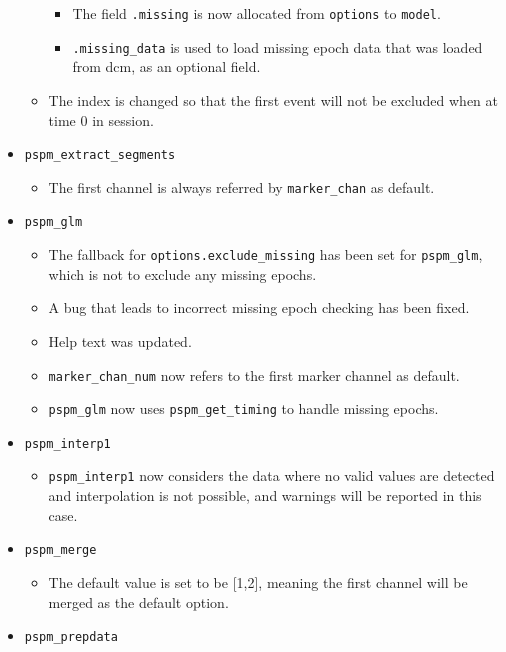 \documentclass[english]{article}
\numberwithin{equation}{section}
\numberwithin{figure}{section}
\begin{document}
\begin{itemize}
\begin{itemize}
    		\begin{itemize}
    			\item The field \texttt{.missing} is now allocated from \texttt{options} to \texttt{model}.
    			\item \texttt{.missing\_data} is used to load missing epoch data that was loaded 
    						from dcm, as an optional field.
    		\end{itemize}
    		\item The index is changed so that the first event will not be excluded when at time 0 in session.
    	\end{itemize}
    	\item \texttt{pspm\_extract\_segments}
    	\begin{itemize}
    		\item The first channel is always referred by \texttt{marker\_chan} as default.
    	\end{itemize}
    	\item \texttt{pspm\_glm}
    	\begin{itemize}
    		\item The fallback for \texttt{options.exclude\_missing} has been set for \texttt{pspm\_glm}, 
    					which is not to exclude any missing epochs.
    		\item A bug that leads to incorrect missing epoch checking has been fixed.
    		\item Help text was updated.
    		\item \texttt{marker\_chan\_num} now refers to the first marker channel as default.
    		\item \texttt{pspm\_glm} now uses \texttt{pspm\_get\_timing} to handle missing epochs.
    	\end{itemize}
    	\item \texttt{pspm\_interp1}
    	\begin{itemize}
    		\item \texttt{pspm\_interp1} now considers the data where no valid values are 
    					detected and interpolation is not possible, and warnings will be reported in this case.
    	\end{itemize}
    	\item \texttt{pspm\_merge}
    	\begin{itemize}
    		\item The default value is set to be [1,2], meaning the first channel will be merged as the default option.
    	\end{itemize}
    	\item \texttt{pspm\_prepdata}

\end{itemize}
\end{document}
